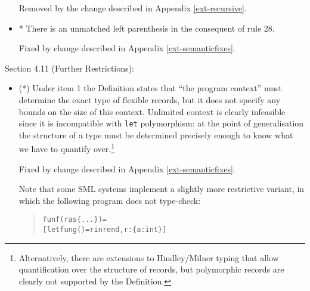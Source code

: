 \documentclass[twoside,titlepage]{article}
\newcommand{\void}[1]{}
\begin{document}
\begin{appendix}
\begin{itemize}
Removed by the change described in Appendix \ref{ext-recursive}.

\item * There is an unmatched left parenthesis in the consequent of rule 28.

Fixed by change described in Appendix \ref{ext-semanticfixes}.

\void{
\item As an artefact of the treatment of type name generativity in the inference rules, the following expression is ill-typed according to the Definition \cite{mistakes}:

\begin{quote}
\begin{alltt}
let
    val r = ref NONE
    datatype t = C
in
    r := SOME C
end
\end{alltt}
\end{quote}

This behaviour is very tedious to implement and there is no real argument for forbidding such examples. Consequently, all SML implementation seem to allow it. Fixing this in favour of a more ``natural'' implementation of generativity would require getting rid of $\oplus$ composition and infer type name sets explicitly.

HaMLet deviates from the Definition in the same way.
}
\end{itemize}


Section 4.11 (Further Restrictions):

\begin{itemize}

\item (*) Under item 1 the Definition states that ``the program context'' must determine the exact type of flexible records, but it does not specify any bounds on the size of this context. Unlimited context is clearly infeasible since it is incompatible with {\tt let} polymorphism: at the point of generalisation the structure of a type must be determined precisely enough to know what we have to quantify over.\footnote{Alternatively, there are extensions to Hindley/Milner typing that allow quantification over the structure of records, but polymorphic records are clearly not supported by the Definition.}

Fixed by change described in Appendix \ref{ext-semanticfixes}.

Note that some SML systems implement a slightly more restrictive variant, in which the following program does not type-check:

\begin{quote}
\begin{alltt}
fun f(r as \{...\}) =
    [let fun g() = r in r end, r : \{a:int\}]
\end{alltt}
\end{quote}


\end{itemize}
\end{appendix}
\end{document}

